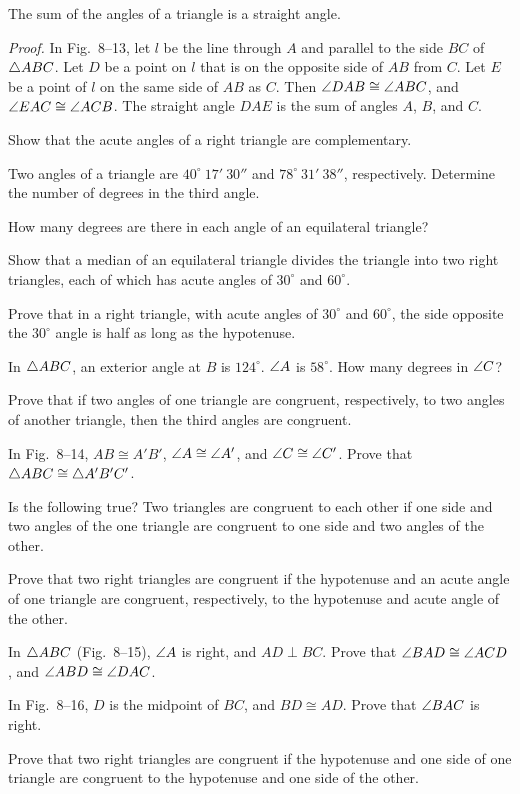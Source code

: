 \documentclass[11pt]{book}
\begin{document}
\begin{theorem}
The sum of the angles of a triangle is a straight angle.
\end{theorem}

\FIGVIIITHIRTEEN

\emph{Proof.} In Fig.~8--13, let $l$ be the line through $A$ and parallel to
the side $BC$ of $\triangle ABC$. Let $D$ be a point on $l$ that is on the
opposite side of $AB$ from $C$. Let $E$ be a point of $l$ on the same side of
$AB$ as $C$. Then $\angle DAB \cong \angle ABC$, and
$\angle EAC \cong \angle ACB$. The straight angle $DAE$ is the sum of angles
$A$, $B$, and $C$.

\begin{exercisecols}
\begin{exlist}
\item Show that the acute angles of a right triangle are complementary.
\item Two angles of a triangle are $40^\circ\ 17'\ 30''$ and
  $78^\circ\ 31'\ 38''$, respectively. Determine the number of degrees in the
  third angle.
\item How many degrees are there in each angle of an equilateral triangle?
\item Show that a median of an equilateral triangle divides the triangle into
  two right triangles, each of which has acute angles of $30^\circ$ and
  $60^\circ$.
\item Prove that in a right triangle, with acute angles of $30^\circ$ and
  $60^\circ$, the side opposite the $30^\circ$ angle is half as long as the
  hypotenuse.
\item In $\triangle ABC$, an exterior angle at $B$ is $124^\circ$. $\angle A$ is
  $58^\circ$. How many degrees in $\angle C$?
\item Prove that if two angles of one triangle are congruent, respectively, to
  two angles of another triangle, then the third angles are congruent.
\item In Fig.~8--14, $AB \cong A'B'$, $\angle A \cong \angle A'$, and
  $\angle C \cong \angle C'$. Prove that $\triangle ABC \cong \triangle A'B'C'$.
\exfig{\FIGVIIIFOURTEEN}
\item Is the following true? Two triangles are congruent to each other if one
  side and two angles of the one triangle are congruent to one side and two
  angles of the other.
\item Prove that two right triangles are congruent if the hypotenuse and an
  acute angle of one triangle are congruent, respectively, to the hypotenuse
  and acute angle of the other.
\item In $\triangle ABC$ (Fig.~8--15), $\angle A$ is right, and $AD \perp BC$. Prove
  that $\angle BAD \cong \angle ACD$, and $\angle ABD \cong \angle DAC$.
\exfig{\FIGVIIIFIFTEEN}
\item[\stex 12.] In Fig.~8--16, $D$ is the midpoint of $BC$, and
  $BD \cong AD$. Prove that $\angle BAC$ is right.
\exfig{\FIGVIIISIXTEEN}
\item[\stex 13.] Prove that two right triangles are congruent if the
  hypotenuse and one side of one triangle are congruent to the hypotenuse and
  one side of the other.
\end{exlist}
\end{exercisecols}
\end{document}
